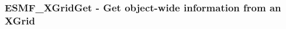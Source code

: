  
\setlength{\oldparskip}{\parskip}
\setlength{\parskip}{1.5ex}
\setlength{\oldparindent}{\parindent}
\setlength{\parindent}{0pt}
\setlength{\oldbaselineskip}{\baselineskip}
\setlength{\baselineskip}{11pt}
 
\def\bv{\begin{verbatim}}
\def\ev{\end{verbatim}}
\def\be{\begin{equation}}
\def\ee{\end{equation}}
\def\bea{\begin{eqnarray}}
\def\eea{\end{eqnarray}}
\def\bi{\begin{itemize}}
\def\ei{\end{itemize}}
\def\bn{\begin{enumerate}}
\def\en{\end{enumerate}}
\def\bd{\begin{description}}
\def\ed{\end{description}}
\def\({\left (}
\def\){\right )}
\def\[{\left [}
\def\]{\right ]}
\def\<{\left  \langle}
\def\>{\right \rangle}
\def\cI{{\cal I}}
\def\diag{\mathop{\rm diag}}
\def\tr{\mathop{\rm tr}}


 
\subsubsection [ESMF\_XGridGet] {ESMF\_XGridGet - Get object-wide information from an XGrid}


